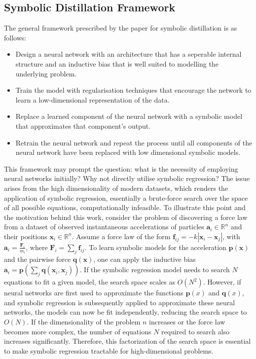 \documentclass[11pt]{article}
\begin{document}
\subsection{Symbolic Distillation Framework}
The general framework prescribed by the paper for symbolic distillation is as follows:
\begin{itemize}
    \item Design a neural network with an architecture that has a seperable internal structure and an inductive bias that is well suited to modelling the underlying problem.
    \item Train the model with regularisation techniques that encourage the network to learn a low-dimensional representation of the data.
    \item Replace a learned component of the neural network with a symbolic model that approximates that component's output.
    \item Retrain the neural network and repeat the process until all components of the neural network have been replaced with low dimensional symbolic models.
\end{itemize}

This framework may prompt the question: what is the necessity of employing neural networks initially? Why not directly utilise symbolic regression? The issue arises from the high dimensionality of modern datasets, which renders the application of symbolic regression, essentially a brute-force search over the space of all possible equations, computationally infeasible. To illustrate this point and the motivation behind this work, consider the problem of discovering a force law from a dataset of observed instantaneous accelerations of particles $\mathbf{a}_i \in \mathbb{R}^n$ and their positions $\mathbf{x}_i \in \mathbb{R}^n$. Assume a force law of the form $\mathbf{f}_{ij} = -k |\mathbf{x}_i - \mathbf{x}_j|$, with $\mathbf{a}_i = \frac{\mathbf{F}_i}{m_i}$, where $\mathbf{F}_i = \sum_j \mathbf{f}_{ij}$. To learn symbolic models for the acceleration $\textbf{p}(\textbf{x})$ and the pairwise force $\textbf{q}(\textbf{x})$, one can apply the inductive bias $\textbf{a}_i = \textbf{p}(\sum_j \textbf{q}(\textbf{x}_i, \textbf{x}_j))$. If the symbolic regression model needs to search $N$ equations to fit a given model, the search space scales as $O(N^2)$. However, if neural networks are first used to approximate the functions $\mathbf{p}(x)$ and $\mathbf{q}(x)$, and symbolic regression is subsequently applied to approximate these neural networks, the models can now be fit independently, reducing the search space to $O(N)$. If the dimensionality of the problem $n$ increases or the force law becomes more complex, the number of equations $N$ required to search also increases significantly. Therefore, this factorization of the search space is essential to make symbolic regression tractable for high-dimensional problems.
\end{document}
